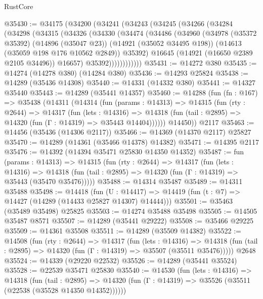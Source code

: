 \begin{lexlean}{RustCore}
\begin{coremodule}
@35430 := @34175
    (@34200
      (@34241
        (@34243
          (@34245
            (@34266
              (@34284
                (@34298
                  (@34315
                    (@34326
                      (@34330
                        (@34474
                          (@34486
                            (@34960
                              (@34978
                                (@35372 @35392)
                                (@14896 (@35047 @23))
                                (@14921 (@35052 @34495 @198))
                                (@14613 (@35059 @198 @176 @10562 @2849))
                                @35392)
                              @16645
                              (@14921 (@16650 @2389 @2105 @34496))
                              @16657)
                            @35392))))))))))))
@35431 := @14272 @380
@35435 := @14274 (@14278 @380) (@14284 @380)
@35436 := @14293 @25824
@35438 := @14289 (@35436 @14308)
@35440 := @14331 (@14332 @380)
@35441 := @14327 @35440
@35443 := @14289 (@35441 @14357)
@35460 := @14288
    (fun (fn : @167) =>
    @35438
      (@14311
        (@14314
          (fun (params : @14313) =>
          @14315
            (fun (rty : @2644) =>
            @14317
              (fun (lets : @14316) =>
              @14318 (fun (tail : @2895) => @14320 (fun (Γ : @14319) => @35443 @14404))))))
        @14450))
    @2117
@35463 := @14456 (@35436 (@14306 @2117))
@35466 := @14369 (@14370 @2117) @25827
@35470 := @14289 (@14361 (@35466 @14378) @14382)
@35471 := @14395 @2117
@35476 := @14392 (@14394 @35471 @25830 @14350 @14352)
@35487 := fun (params : @14313) =>
  @14315
    (fun (rty : @2644) =>
    @14317
      (fun (lets : @14316) =>
      @14318 (fun (tail : @2895) => @14320 (fun (Γ : @14319) => @35443 (@35470 @35476)))))
@35488 := @14314 @35487
@35489 := @14311 @35488
@35498 := @14418
    (fun (U : @14417) => @14419 (fun (t : @7) => @14427 (@14289 (@14433 @25827 @14307) @14444)))
@35501 := @35463 (@35489 @35498) @25825
@35503 := @14274 @35488 @35498
@35505 := @14505 @35487 @8571
@35507 := @14289 (@35441 @29222)
@35508 := @35466 @29225
@35509 := @14361 @35508
@35511 := @14289 (@35509 @14382)
@35522 := @14508
    (fun (rty : @2644) =>
    @14317
      (fun (lets : @14316) =>
      @14318 (fun (tail : @2895) => @14320 (fun (Γ : @14319) => @35507 (@35511 @35476)))))
    @2648
@35524 := @14339 (@29220 @22532)
@35526 := @14289 (@35441 @35524)
@35528 := @22539 @35471 @25830
@35540 := @14530
    (fun (lets : @14316) =>
    @14318
      (fun (tail : @2895) =>
      @14320 (fun (Γ : @14319) => @35526 (@35511 (@22538 (@35528 @14350 @14352))))))

\end{coremodule}
\end{lexlean}
